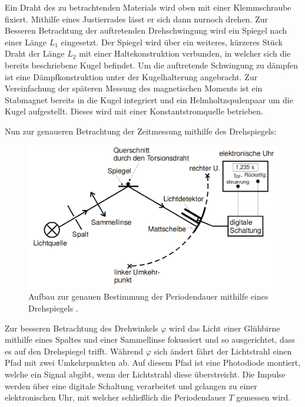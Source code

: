         Ein Draht des zu betrachtenden Materials wird oben mit einer Klemmschraube fixiert. Mithilfe eines
           Justierrades lässt er sich dann nurnoch drehen. Zur Besseren
            Betrachtung der auftretenden Drehschwingung wird ein Spiegel nach einer Länge $L_1$ eingesetzt. Der
             Spiegel wird über ein weiteres, kürzeres Stück Draht der Länge $L_2$ mit
             einer Haltekonstruktion verbunden, in welcher sich die bereits
              beschriebene Kugel befindet.
               Um die auftretende Schwingung zu dämpfen ist eine Dämpfkonstruktion
                unter der Kugelhalterung angebracht. Zur Vereinfachung der späteren Messung des magnetischen Moments ist ein Stabmagnet
               bereits in die Kugel integriert und ein Helmholtzspulenpaar um die Kugel aufgestellt. Dieses wird
                 mit einer Konstantstromquelle betrieben.

                 Nun zur genaueren Betrachtung der Zeitmessung mithilfe des Drehspiegels:

                 \begin{figure}[H]
                          \centering
                          \includegraphics[width=\linewidth-150pt,height=\textheight-150pt,keepaspectratio]{content/Bilder/Drehspiegel.png}
                          \caption{Aufbau zur genauen Bestimmung der Periodendauer mithilfe eines Drehspiegels \cite{V102}.}
                          \label{fig:Drehspiegel}
                        \end{figure}

Zur besseren Betrachtung des Drehwinkels $\varphi$ wird das Licht einer Glühbirne
 mithilfe eines Spaltes und einer Sammellinse fokussiert und so ausgerichtet,
  dass es auf den Drehspiegel trifft. Während $\varphi$ sich ändert fährt der
   Lichtstrahl einen Pfad mit zwei Umkehrpunkten ab. Auf diesem Pfad ist eine
    Photodiode montiert, welche ein Signal abgibt, wenn der Lichtstrahl
     diese überstreicht. Die Impulse werden über eine digitale Schaltung verarbeitet und
      gelangen zu einer elektronischen Uhr, mit welcher schließlich die Periodendauer $T$ gemessen wird.

